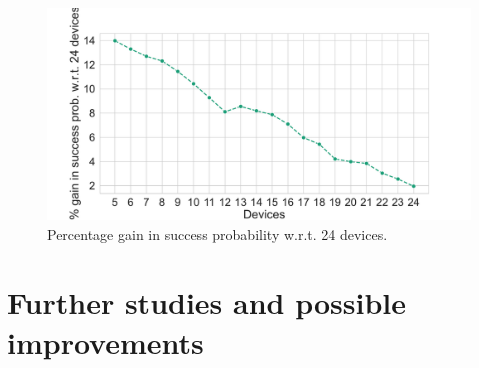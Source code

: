\documentclass[10pt, a4paper, twocolumn]{article}
\theoremstyle{definition}
\begin{document}
\begin{figure}
    \centering
    \includegraphics[scale = 0.4]{images/percentage_prob_wrt24_rolling4.pdf}
    \caption{Percentage gain in success probability w.r.t. 24 devices.}
    \label{fig:percentage_prob}
\end{figure}
\section{Further studies and possible improvements}
\end{document}
